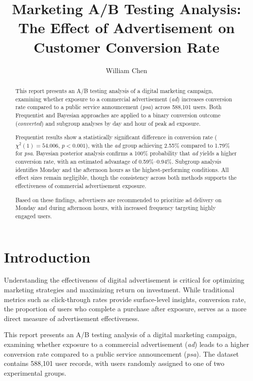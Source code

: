 \documentclass[12pt]{article}
\title{
    \vspace{-1cm}
    \large\textbf{Marketing A/B Testing Analysis:\\
    The Effect of Advertisement on Customer Conversion Rate}
}
\author{
    William Chen
}
\date{}
\begin{document}
\maketitle
\thispagestyle{empty}

\begin{abstract}
This report presents an A/B testing analysis of a digital marketing campaign, 
examining whether exposure to a commercial advertisement (\textit{ad}) increases 
conversion rate compared to a public service announcement (\textit{psa}) across 
588,101 users. Both Frequentist and Bayesian approaches are applied to a binary 
conversion outcome (\textit{converted}) and subgroup analyses by day and hour of 
peak ad exposure.

Frequentist results show a statistically significant difference in conversion rate 
($\chi^2(1) = 54.006$, $p < 0.001$), with the \textit{ad} group achieving 2.55\% 
compared to 1.79\% for \textit{psa}. Bayesian posterior analysis confirms a 
100\% probability that \textit{ad} yields a higher conversion rate, with an 
estimated advantage of 0.59\%--0.94\%. Subgroup analysis identifies Monday and 
the afternoon hours as the highest-performing conditions. All effect sizes remain 
negligible, though the consistency across both methods supports the effectiveness 
of commercial advertisement exposure.

Based on these findings, advertisers are recommended to prioritize ad delivery 
on Monday and during afternoon hours, with increased frequency targeting highly 
engaged users.
\end{abstract}

\newpage

\section{Introduction}
Understanding the effectiveness of digital advertisement is critical for 
optimizing marketing strategies and maximizing return on investment. While 
traditional metrics such as click-through rates provide surface-level insights, 
conversion rate, the proportion of users who complete a purchase after exposure, 
serves as a more direct measure of advertisement effectiveness.

This report presents an A/B testing analysis of a digital marketing campaign, 
examining whether exposure to a commercial advertisement (\textit{ad}) leads to 
a higher conversion rate compared to a public service announcement (\textit{psa}). 
The dataset contains 588,101 user records, with users randomly assigned to one 
of two experimental groups.
\end{document}
